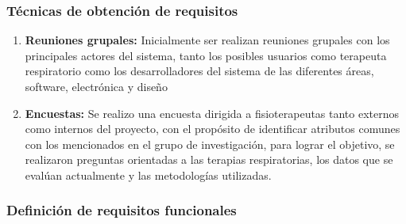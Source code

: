 \documentclass[12pt]{article}
\begin{document}
\subsubsection{Técnicas de obtención de requisitos}

\begin{enumerate}
    \item \textbf{Reuniones grupales:} Inicialmente ser realizan reuniones grupales con los principales actores del sistema, tanto los posibles usuarios como terapeuta respiratorio como los desarrolladores del sistema de las diferentes áreas, software, electrónica y diseño
    \item \textbf{Encuestas:} Se realizo una encuesta dirigida a fisioterapeutas tanto externos como internos del proyecto, con el propósito de identificar atributos comunes con los mencionados en el grupo de investigación, para lograr el objetivo, se realizaron preguntas orientadas a las terapias respiratorias, los datos que se evalúan actualmente y las metodologías utilizadas.
\end{enumerate}




\subsubsection{Definición de requisitos funcionales}

\end{document}
